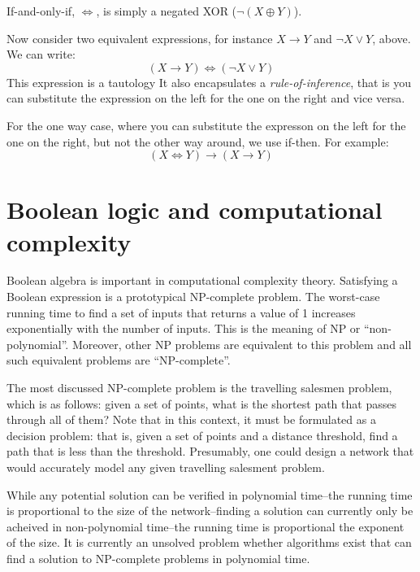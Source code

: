 \documentclass{article}
\begin{document}
If-and-only-if, $\iff$, is simply a negated XOR ($\lnot (X \oplus Y)$).

Now consider two equivalent expressions, for instance $X \rightarrow Y$
and $\lnot X \lor Y$, above.
We can write:
\begin{equation}
	(X \rightarrow Y) \iff (\lnot X \lor Y)
\end{equation}
This expression is a tautology
It also encapsulates a {\it rule-of-inference},
that is you can substitute the expression on the left for the one on the right
and vice versa.

For the one way case, where you can substitute the expresson on the left
for the one on the right, but not the other way around, we use if-then.
For example:
\begin{equation}
	(X \iff Y) \rightarrow (X \rightarrow Y)
\end{equation}


\section{Boolean logic and computational complexity}

Boolean algebra is important in computational complexity theory.
Satisfying a Boolean expression is a prototypical NP-complete problem.
The worst-case running time to find a set of inputs that returns a value of 1
increases exponentially with the number of inputs.
This is the meaning of NP or ``non-polynomial''.
Moreover, other NP problems are equivalent to this problem and all such 
equivalent problems are ``NP-complete''.

The most discussed NP-complete problem is the travelling salesmen problem,
which is as follows: given a set of points, what is the shortest path that
passes through all of them?
Note that in this context, it must be formulated as a decision problem:
that is, given a set of points and a distance threshold, find a path that
is less than the threshold.
Presumably, one could design a network that would accurately model any given
travelling salesment problem.

While any potential solution can be verified in polynomial time--the
running time is proportional to the size of the network--finding a solution
can currently only be acheived in non-polynomial time--the running time
is proportional the exponent of the size.
It is currently an unsolved problem whether algorithms exist that can
find a solution to NP-complete problems in polynomial time.
\end{document}
